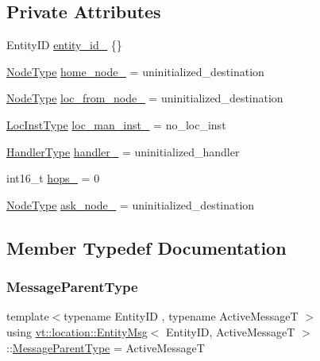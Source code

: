 \subsection*{Private Attributes}
\begin{DoxyCompactItemize}
\item 
Entity\+ID \hyperlink{structvt_1_1location_1_1_entity_msg_a7c50fcdb28e43633811173c6850380f2}{entity\+\_\+id\+\_\+} \{\}
\item 
\hyperlink{namespacevt_a866da9d0efc19c0a1ce79e9e492f47e2}{Node\+Type} \hyperlink{structvt_1_1location_1_1_entity_msg_a013a64971bd245f15f12aed3609d27e9}{home\+\_\+node\+\_\+} = uninitialized\+\_\+destination
\item 
\hyperlink{namespacevt_a866da9d0efc19c0a1ce79e9e492f47e2}{Node\+Type} \hyperlink{structvt_1_1location_1_1_entity_msg_a4e1bc853e380b513f04eddb25f6e0cd7}{loc\+\_\+from\+\_\+node\+\_\+} = uninitialized\+\_\+destination
\item 
\hyperlink{namespacevt_1_1location_a4db6456e8024af2d23fc5ae560fef866}{Loc\+Inst\+Type} \hyperlink{structvt_1_1location_1_1_entity_msg_a6a4e4b87147e3ce6b2c48c21e51d9995}{loc\+\_\+man\+\_\+inst\+\_\+} = no\+\_\+loc\+\_\+inst
\item 
\hyperlink{namespacevt_af64846b57dfcaf104da3ef6967917573}{Handler\+Type} \hyperlink{structvt_1_1location_1_1_entity_msg_a13540b561e587b92c4ff43656e022bb0}{handler\+\_\+} = uninitialized\+\_\+handler
\item 
int16\+\_\+t \hyperlink{structvt_1_1location_1_1_entity_msg_a7703bd3911f04d9c0eff0eab58bf677c}{hops\+\_\+} = 0
\item 
\hyperlink{namespacevt_a866da9d0efc19c0a1ce79e9e492f47e2}{Node\+Type} \hyperlink{structvt_1_1location_1_1_entity_msg_ae1cae8c818d70070238c0f5b975e2a80}{ask\+\_\+node\+\_\+} = uninitialized\+\_\+destination
\end{DoxyCompactItemize}


\subsection{Member Typedef Documentation}
\mbox{\label{structvt_1_1location_1_1_entity_msg_a186637100a628eb04cb00127f5579210}} 
\subsubsection{\texorpdfstring{Message\+Parent\+Type}{MessageParentType}}
{\footnotesize\ttfamily template$<$typename Entity\+ID , typename Active\+MessageT $>$ \\
using \hyperlink{structvt_1_1location_1_1_entity_msg}{vt\+::location\+::\+Entity\+Msg}$<$ Entity\+ID, Active\+MessageT $>$\+::\hyperlink{structvt_1_1location_1_1_entity_msg_a186637100a628eb04cb00127f5579210}{Message\+Parent\+Type} =  Active\+MessageT}



